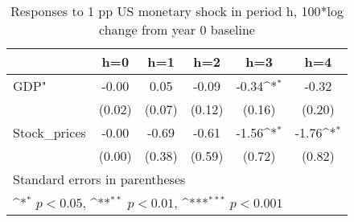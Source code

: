 \begin{table}[htbp]\centering
\def\sym#1{\ifmmode^{#1}\else\(^{#1}\)\fi}
\caption{Responses to 1 pp US monetary shock in period h, 100*log change from year 0 baseline}
\begin{tabular}{l*{5}{c}}
\hline\hline
            &\multicolumn{1}{c}{h=0}&\multicolumn{1}{c}{h=1}&\multicolumn{1}{c}{h=2}&\multicolumn{1}{c}{h=3}&\multicolumn{1}{c}{h=4}\\
\hline
GDP"        &       -0.00         &        0.05         &       -0.09         &       -0.34\sym{*}  &       -0.32         \\
            &      (0.02)         &      (0.07)         &      (0.12)         &      (0.16)         &      (0.20)         \\
[1em]
Stock\_prices&       -0.00         &       -0.69         &       -0.61         &       -1.56\sym{*}  &       -1.76\sym{*}  \\
            &      (0.00)         &      (0.38)         &      (0.59)         &      (0.72)         &      (0.82)         \\
\hline\hline
\multicolumn{6}{l}{\footnotesize Standard errors in parentheses}\\
\multicolumn{6}{l}{\footnotesize \sym{*} \(p<0.05\), \sym{**} \(p<0.01\), \sym{***} \(p<0.001\)}\\
\end{tabular}
\end{table}
